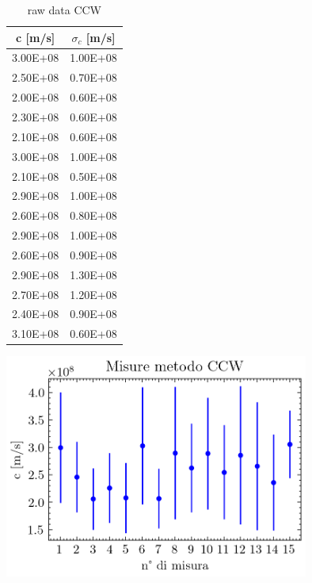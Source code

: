 \documentclass[openright]{article}
\begin{document}
        \begin{table}[H]
            \begin{minipage}{0.35\linewidth}
                \begin{tabular}{ c c } 
                    
                    \toprule
                    c [m/s] &  $\sigma_c$ [m/s] \\ 
                    \midrule
                    3.00E+08	&    1.00E+08 \\
                    2.50E+08	&    0.70E+08 \\
                    2.00E+08	&    0.60E+08 \\
                    2.30E+08	&    0.60E+08 \\
                    2.10E+08	&    0.60E+08 \\
                    3.00E+08	&    1.00E+08 \\
                    2.10E+08	&    0.50E+08 \\
                    2.90E+08	&    1.00E+08 \\
                    2.60E+08	&    0.80E+08 \\
                    2.90E+08	&    1.00E+08 \\
                    2.60E+08	&    0.90E+08 \\
                    2.90E+08	&    1.30E+08 \\
                    2.70E+08	&    1.20E+08 \\
                    2.40E+08	&    0.90E+08 \\
                    3.10E+08	&    0.60E+08 \\
        
                    \bottomrule           \end{tabular}
                \caption{raw data CCW}

            \end{minipage}
            \begin{minipage}{0.65\linewidth}
            \centering
            \includegraphics[width=10cm]{../images/CCW.png}
            \label{Misure CCW}
	        \end{minipage}
	        
        \end{table}
\end{document}
